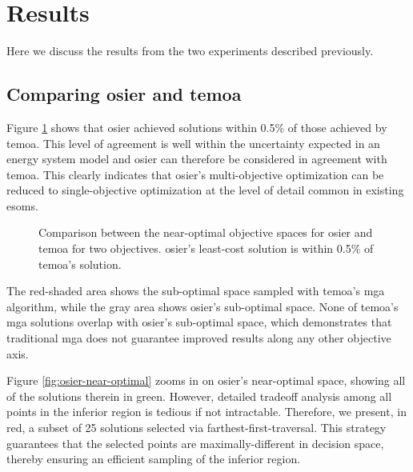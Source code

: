 \section{Results}

Here we discuss the results from the two experiments described previously.

\subsection{Comparing \gls{osier} and \gls{temoa}}

Figure \ref{fig:osier-temoa-benchmark} shows that \gls{osier} achieved solutions
within 0.5\%  of those achieved by \gls{temoa}. This level of agreement is well
within the uncertainty expected in an energy system model and \gls{osier} can
therefore be considered in agreement with \gls{temoa}. This clearly indicates
that \gls{osier}'s multi-objective optimization can be reduced to
single-objective optimization at the level of detail common in existing
\glspl{esom}.

\begin{figure}[ht!]
    \begin{center}
        \resizebox{\columnwidth}{!}{}
        \caption{Comparison between the near-optimal objective spaces for \gls{osier} and
        \gls{temoa} for two objectives. \gls{osier}'s least-cost solution is
        within 0.5\% of \gls{temoa}'s solution.}
        \label{fig:osier-temoa-benchmark}
    \end{center}
\end{figure}

The red-shaded area shows the sub-optimal space sampled with \gls{temoa}'s
\gls{mga} algorithm, while the gray area shows \gls{osier}'s sub-optimal space.
None of \gls{temoa}'s \gls{mga} solutions overlap with \gls{osier}'s sub-optimal
space, which demonstrates that traditional \gls{mga} does not guarantee improved
results along any other objective axis. 

Figure \ref{fig:osier-near-optimal} zooms in on \gls{osier}'s near-optimal
space, showing all of the solutions therein in green. However, 
detailed tradeoff analysis among all points in the inferior region is 
tedious if not intractable. Therefore, we present, in red, a subset of 25 solutions 
selected via farthest-first-traversal. This strategy guarantees that the selected points
are maximally-different in decision space, thereby ensuring an efficient sampling of
the inferior region.

